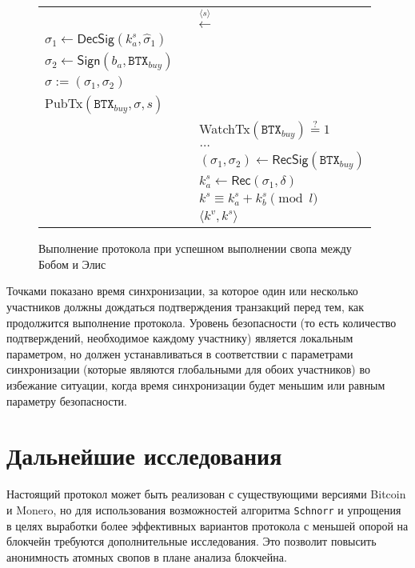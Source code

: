 \documentclass{llncs}
\newcommand{\BTX}{\texttt{BTX}}
\newcommand{\DecSig}{\textsf{DecSig}}
\newcommand{\Sign}{\textsf{Sign}}
\newcommand{\Rec}{\textsf{Rec}}
\newcommand{\hatsigma}{\hat{\sigma}}
\newcommand{\PubTx}{\textsf{PubTx}}
\newcommand{\WatchTx}{\textsf{WatchTx}}
\newcommand{\RecSig}{\textsf{RecSig}}
\begin{document}
\begin{figure}[H]
\begin{table}[H]
{\begin{tabular}{ | l c l | }
          \multicolumn{3}{|c|}{$\xleftarrow{\langle s \rangle}$} \\

          $\sigma_1 \gets \DecSig(k^s_a, \hatsigma_1)$ & & \\
          $\sigma_2 \gets \Sign(b_a, \BTX_\textit{buy})$ & & \\
          $\sigma := (\sigma_1, \sigma_2)$ & & \\
          \PubTx$(\BTX_\textit{buy}, \sigma, s)$ & & \\

          & & \WatchTx$(\BTX_\textit{buy}) \stackrel{?}{=} 1$ \\
          \multicolumn{3}{|c|}{$\dots$} \\

          & & $(\sigma_1, \sigma_2) \gets \RecSig(\BTX_\textit{buy})$ \\
          & & $k^s_a \gets \Rec(\sigma_1, \delta)$ \\
          & & $k^s \equiv k^s_a + k^s_b \pmod l$ \\
          & & $\langle k^v, k^s \rangle$ \\
        \hline
      \end{tabular}}
    \end{table}
  \caption{Выполнение протокола при успешном выполнении свопа между Бобом и Элис}
  \label{fig:protocol}
\end{figure}

Точками показано время синхронизации, за которое один или несколько участников должны дождаться подтверждения транзакций перед тем, как продолжится выполнение протокола. Уровень безопасности (то есть количество подтверждений, необходимое каждому участнику) является локальным параметром, но должен устанавливаться в соответствии с параметрами синхронизации (которые являются глобальными для обоих участников) во избежание ситуации, когда время синхронизации будет меньшим или равным параметру безопасности.

\section{Дальнейшие исследования}
Настоящий протокол может быть реализован с существующими версиями Bitcoin и Monero, но для использования возможностей алгоритма \texttt{Schnorr} и упрощения в целях выработки более эффективных вариантов протокола с меньшей опорой на блокчейн требуются дополнительные исследования. Это позволит повысить анонимность атомных свопов в плане анализа блокчейна.
\end{document}
